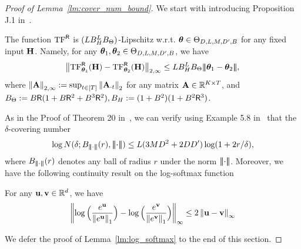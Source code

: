 \begin{proof}[Proof of Lemma~\ref{lm:cover_num_bound}]
We start with introducing Proposition J.1 in~\cite{bai2023transformers}. 
\begin{proposition}\label{prop:bai_j1}
The function ${\rm TF}^{\mathsf{R}}$ is $({L}{B}^{{L}}_{H}{B}_{\Theta})$-Lipschitz w.r.t. ${{\boldsymbol \theta}}\in{\Theta}_{D, {L},{M},{D'},{B}}$ for any fixed input ${{\mathbf H}}$. Namely, for any ${{\boldsymbol \theta}}_1,{{\boldsymbol \theta}}_2\in{\Theta}_{D, {L},{M},{D'},{B}}$, we have
\begin{align*}
    \big\|{{\rm TF}^{\mathsf{R}}_{{{\boldsymbol \theta}}_1}({{\mathbf H}})-{\rm TF}^{\mathsf{R}}_{{{\boldsymbol \theta}}_2}({{\mathbf H}})}\big\|_{2,{\infty}}\leq {L}{B}^{{L}}_{H}{B}_{\Theta}{\left|\!\left|\!\left|{{{\boldsymbol \theta}}_1-{{\boldsymbol \theta}}_2}\right|\!\right|\!\right|},
\end{align*}
where $\left\|{{\mathbf A}}\right\|_{2,{\infty}}:=\sup_{t\in[T]}\left\|{{\mathbf A}_{\cdot t}}\right\|_2$  for any matrix ${\mathbf A}\in\mathbb{R}^{K\times T}$, and ${B}_\Theta:={B}{\mathsf{R}}(1+{B}{\mathsf{R}}^2+{B}^3{\mathsf{R}}^2),{B}_H:=(1+{B}^2)(1+{B}^2{\mathsf{R}}^3)$. 
\end{proposition}
As in the Proof of Theorem 20 in~\cite{bai2023transformers}, we can verify using Example 5.8 in~\cite{wainwright2019high} that the $\delta$-covering number 
\begin{align}\log N(\delta;\normb_{\nrmp{\cdot}}(r),\nrmp{\cdot})\leq \layer(3\head\embd^2+2\embd\hidden)\log(1+2r/\delta),\label{eq:cover_norm_ball}
\end{align}where ${B}_{{\left|\!\left|\!\left|{\cdot}\right|\!\right|\!\right|}}(r)$ denotes any ball of radius $r$ under the norm ${\left|\!\left|\!\left|{\cdot}\right|\!\right|\!\right|}$.  Moreover, we have the following continuity result on the log-softmax function
\begin{lemma}\label{lm:log_softmax}
    For any ${\mathbf u},{\mathbf v}\in\mathbb{R}^d$, we have 
    \begin{align*}
    \left\|{\log \Big(\frac{e^{\mathbf u}}{\left\|{e^{\mathbf u}}\right\|_1}\Big)-\log \Big(\frac{e^{\mathbf v}}{\left\|{e^{\mathbf v}}\right\|_1}\Big)}\right\|_\infty\leq 2\left\|{{\mathbf u}-{\mathbf v}}\right\|_\infty
    \end{align*}
\end{lemma}
We defer the proof of Lemma~\ref{lm:log_softmax} to the end of this section.


\end{proof}
